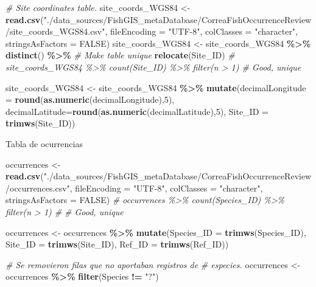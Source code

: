 \documentclass[sn-apa,pdflatex]{sn-jnl}
\newenvironment{Shaded}{\begin{snugshade}}{\end{snugshade}}
\newcommand{\AttributeTok}[1]{\textcolor[rgb]{0.13,0.29,0.53}{#1}}
\newcommand{\CommentTok}[1]{\textcolor[rgb]{0.56,0.35,0.01}{\textit{#1}}}
\newcommand{\ConstantTok}[1]{\textcolor[rgb]{0.56,0.35,0.01}{#1}}
\newcommand{\DecValTok}[1]{\textcolor[rgb]{0.00,0.00,0.81}{#1}}
\newcommand{\FunctionTok}[1]{\textcolor[rgb]{0.13,0.29,0.53}{\textbf{#1}}}
\newcommand{\NormalTok}[1]{#1}
\newcommand{\OtherTok}[1]{\textcolor[rgb]{0.56,0.35,0.01}{#1}}
\newcommand{\SpecialCharTok}[1]{\textcolor[rgb]{0.81,0.36,0.00}{\textbf{#1}}}
\newcommand{\StringTok}[1]{\textcolor[rgb]{0.31,0.60,0.02}{#1}}
\begin{document}
\begin{Shaded}
\begin{Highlighting}[]
\CommentTok{\# Site coordinates table.  }
\NormalTok{site\_coords\_WGS84 }\OtherTok{\textless{}{-}} \FunctionTok{read.csv}\NormalTok{(}\StringTok{"./data\_sources/FishGIS\_metaDatabase/CorreaFishOccurrenceReview/site\_coords\_WGS84.csv"}\NormalTok{, }\AttributeTok{fileEncoding =} \StringTok{"UTF{-}8"}\NormalTok{, }\AttributeTok{colClasses =} \StringTok{"character"}\NormalTok{, }\AttributeTok{stringsAsFactors =} \ConstantTok{FALSE}\NormalTok{)}
\NormalTok{site\_coords\_WGS84 }\OtherTok{\textless{}{-}}\NormalTok{ site\_coords\_WGS84 }\SpecialCharTok{\%\textgreater{}\%} 
  \FunctionTok{distinct}\NormalTok{() }\SpecialCharTok{\%\textgreater{}\%} \CommentTok{\# Make table unique}
  \FunctionTok{relocate}\NormalTok{(Site\_ID)}
  \CommentTok{\# site\_coords\_WGS84 \%\textgreater{}\% count(Site\_ID) \%\textgreater{}\% filter(n \textgreater{} 1) \# Good, unique}

\NormalTok{site\_coords\_WGS84 }\OtherTok{\textless{}{-}}\NormalTok{ site\_coords\_WGS84 }\SpecialCharTok{\%\textgreater{}\%} 
  \FunctionTok{mutate}\NormalTok{(}\AttributeTok{decimalLongitude =} \FunctionTok{round}\NormalTok{(}\FunctionTok{as.numeric}\NormalTok{(decimalLongitude),}\DecValTok{5}\NormalTok{),}
         \AttributeTok{decimalLatitude=}\FunctionTok{round}\NormalTok{(}\FunctionTok{as.numeric}\NormalTok{(decimalLatitude),}\DecValTok{5}\NormalTok{),}
         \AttributeTok{Site\_ID =} \FunctionTok{trimws}\NormalTok{(Site\_ID))}
\end{Highlighting}
\end{Shaded}

Tabla de ocurrencias

\begin{Shaded}
\begin{Highlighting}[]
\NormalTok{occurrences }\OtherTok{\textless{}{-}} \FunctionTok{read.csv}\NormalTok{(}\StringTok{"./data\_sources/FishGIS\_metaDatabase/CorreaFishOccurrenceReview/occurrences.csv"}\NormalTok{,}
    \AttributeTok{fileEncoding =} \StringTok{"UTF{-}8"}\NormalTok{, }\AttributeTok{colClasses =} \StringTok{"character"}\NormalTok{, }\AttributeTok{stringsAsFactors =} \ConstantTok{FALSE}\NormalTok{)}
\CommentTok{\# occurrences \%\textgreater{}\% count(Species\_ID) \%\textgreater{}\% filter(n \textgreater{} 1) \#}
\CommentTok{\# Good, unique}

\NormalTok{occurrences }\OtherTok{\textless{}{-}}\NormalTok{ occurrences }\SpecialCharTok{\%\textgreater{}\%}
    \FunctionTok{mutate}\NormalTok{(}\AttributeTok{Species\_ID =} \FunctionTok{trimws}\NormalTok{(Species\_ID), }\AttributeTok{Site\_ID =} \FunctionTok{trimws}\NormalTok{(Site\_ID),}
        \AttributeTok{Ref\_ID =} \FunctionTok{trimws}\NormalTok{(Ref\_ID))}

\CommentTok{\# Se removieron filas que no aportaban registros de}
\CommentTok{\# especies.}
\NormalTok{occurrences }\OtherTok{\textless{}{-}}\NormalTok{ occurrences }\SpecialCharTok{\%\textgreater{}\%}
    \FunctionTok{filter}\NormalTok{(Species }\SpecialCharTok{!=} \StringTok{"?"}\NormalTok{)}
\end{Highlighting}
\end{Shaded}
\end{document}
